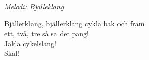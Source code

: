 {\footnotesize\textit{Melodi: Bjälleklang}}\par
\vspace{10pt}
Bjällerklang, bjällerklang cykla bak och fram\\
ett, två, tre så sa det pang!\\
Jäkla cykelslang!\\
Skål!
